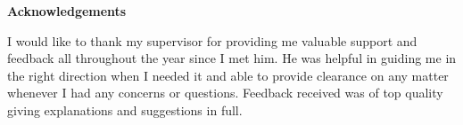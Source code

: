 \mbox{}\newline\vspace{10mm} \mbox{}\LARGE
{\bf Acknowledgements} \normalsize \vspace{5mm}

    I would like to thank my supervisor for providing me valuable support and feedback all throughout the year since I met him. He was helpful in guiding me in the right direction when I needed it and able to provide clearance on any matter whenever I had any concerns or questions. Feedback received was of top quality giving explanations and suggestions in full.
